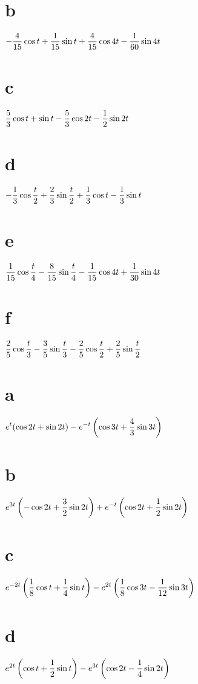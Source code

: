 \part{b} $\displaystyle{-\frac{4}{15}\cos t+\frac{1}{15}\sin t
+\frac{4}{15}\cos4t-\frac{1}{60}\sin4t}$\;

\quad\;
\part{c} $\displaystyle{\frac{5}{3}\cos t+\sin t-\frac{5}{3}
\cos2t-\frac{1}{2}\sin2t}$\;
\part{d} $\displaystyle{-\frac{1}{3}\cos\frac{t}{2}+\frac{2}{3}
\sin\frac{t}{2}+\frac{1}{3}\cos t-\frac{1}{3}\sin t}$\;

\quad\;
\part{e}
$\displaystyle{\frac{1}{15}\cos\frac{t}{4}-\frac{8}{15}\sin\frac{t}{4}-\frac{1}{15}\cos4t+\frac{1}{30}\sin4t}$\;
\part{f}
$\displaystyle{\frac{2}{5}\cos\frac{t}{3}-\frac{3}{5}\sin\frac{t}{3}
-\frac{2}{5}\cos\frac{t}{2}+\frac{2}{5}\sin\frac{t}{2}}$

\;
\part{a} $\displaystyle{e^{t}(\cos2t+\sin2t)-e^{-t}\left(\cos
3t+\frac{4}{3}\sin3t\right)}$\;
\part{b} $\displaystyle{e^{3t}\left(-\cos2t+\frac{3}{2}\sin
2t\right)+e^{-t}\left(\cos2t+\frac{1}{2}\sin2t\right)}$

\quad\;
 \part{c} $\displaystyle{e^{-2t}\left(\frac{1}{8}\cos t+\frac{1}{4}\sin t\right)-e^{2t}\left(\frac{1}{8}\cos3t-\frac{1}{12}\sin
3t\right)}$\;
\part{d} $\displaystyle{e^{2t}\left(\cos t+\frac{1}{2}\sin
t\right)-e^{3t}\left(\cos2t-\frac{1}{4}\sin2t\right)}$


